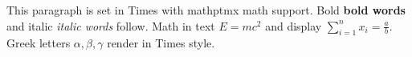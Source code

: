 \documentclass{article}
\begin{document}
This paragraph is set in Times with mathptmx math support.
Bold \textbf{bold words} and italic \textit{italic words} follow.
Math in text $E = mc^2$ and display $\sum_{i=1}^{n} x_i = \frac{a}{b}$.
Greek letters $\alpha, \beta, \gamma$ render in Times style.
\end{document}
